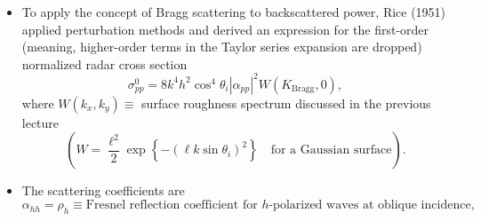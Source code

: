 \documentclass[11pt, oneside]{article}
\begin{document}
\begin{itemize}
	\item To apply the concept of Bragg scattering to backscattered power, Rice (1951) applied perturbation methods and derived an expression for the first-order (meaning, higher-order terms in the Taylor series expansion are dropped) normalized radar cross section
	\begin{equation}
		\label{e:spm}
		\sigma_{pp}^0 = 8k^4h^2\cos^4\theta_i\left|\alpha_{pp}\right|^2W\left(K_\mathrm{Bragg},0\right),
	\end{equation}
	where $W(k_x,k_y) \equiv$ surface roughness spectrum discussed in the previous lecture
	\begin{equation}
		\label{e:Wg}
		\left(W = \frac{\ell^2}{2}\exp\left\{-\left(\ell k\sin\theta_i\right)^2\right\} \quad \text{for a Gaussian surface}\right).
	\end{equation}
	\item The scattering coefficients are
	\begin{equation}
		\label{e:ahh}
		\alpha_{hh} = \rho_h \equiv \text{Fresnel reflection coefficient for $h$-polarized waves at oblique incidence},
	\end{equation}

\end{itemize}
\end{document}
